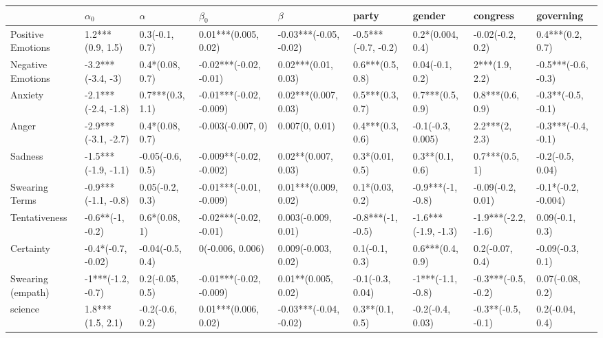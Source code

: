 \begin{tabular}{lllllllll}
\toprule
{} &           $\alpha_0$ &          $\alpha$ &                $\beta_0$ &                 $\beta$ &                party &               gender &             congress &            governing \\
\midrule
Positive Emotions     &     1.2***(0.9, 1.5) &    0.3(-0.1, 0.7) &     0.01***(0.005, 0.02) &  -0.03***(-0.05, -0.02) &  -0.5***(-0.7, -0.2) &     0.2*(0.004, 0.4) &     -0.02(-0.2, 0.2) &     0.4***(0.2, 0.7) \\
Negative Emotions     &    -3.2***(-3.4, -3) &   0.4*(0.08, 0.7) &   -0.02***(-0.02, -0.01) &     0.02***(0.01, 0.03) &     0.6***(0.5, 0.8) &      0.04(-0.1, 0.2) &       2***(1.9, 2.2) &  -0.5***(-0.6, -0.3) \\
Anxiety               &  -2.1***(-2.4, -1.8) &  0.7***(0.3, 1.1) &  -0.01***(-0.02, -0.009) &    0.02***(0.007, 0.03) &     0.5***(0.3, 0.7) &     0.7***(0.5, 0.9) &     0.8***(0.6, 0.9) &   -0.3**(-0.5, -0.1) \\
Anger                 &  -2.9***(-3.1, -2.7) &   0.4*(0.08, 0.7) &        -0.003(-0.007, 0) &          0.007(0, 0.01) &     0.4***(0.3, 0.6) &    -0.1(-0.3, 0.005) &       2.2***(2, 2.3) &  -0.3***(-0.4, -0.1) \\
Sadness               &  -1.5***(-1.9, -1.1) &  -0.05(-0.6, 0.5) &  -0.009**(-0.02, -0.002) &     0.02**(0.007, 0.03) &      0.3*(0.01, 0.5) &      0.3**(0.1, 0.6) &       0.7***(0.5, 1) &     -0.2(-0.5, 0.04) \\
Swearing Terms        &  -0.9***(-1.1, -0.8) &   0.05(-0.2, 0.3) &  -0.01***(-0.01, -0.009) &    0.01***(0.009, 0.02) &      0.1*(0.03, 0.2) &    -0.9***(-1, -0.8) &    -0.09(-0.2, 0.01) &  -0.1*(-0.2, -0.004) \\
Tentativeness         &     -0.6**(-1, -0.2) &     0.6*(0.08, 1) &   -0.02***(-0.02, -0.01) &     0.003(-0.009, 0.01) &    -0.8***(-1, -0.5) &  -1.6***(-1.9, -1.3) &  -1.9***(-2.2, -1.6) &      0.09(-0.1, 0.3) \\
Certainty             &   -0.4*(-0.7, -0.02) &  -0.04(-0.5, 0.4) &         0(-0.006, 0.006) &     0.009(-0.003, 0.02) &       0.1(-0.1, 0.3) &     0.6***(0.4, 0.9) &      0.2(-0.07, 0.4) &     -0.09(-0.3, 0.1) \\
Swearing (empath)     &    -1***(-1.2, -0.7) &   0.2(-0.05, 0.5) &  -0.01***(-0.02, -0.009) &     0.01**(0.005, 0.02) &     -0.1(-0.3, 0.04) &    -1***(-1.1, -0.8) &  -0.3***(-0.5, -0.2) &     0.07(-0.08, 0.2) \\
science               &     1.8***(1.5, 2.1) &   -0.2(-0.6, 0.2) &     0.01***(0.006, 0.02) &  -0.03***(-0.04, -0.02) &      0.3**(0.1, 0.5) &     -0.2(-0.4, 0.03) &   -0.3**(-0.5, -0.1) &      0.2(-0.04, 0.4) \\

\end{tabular}
